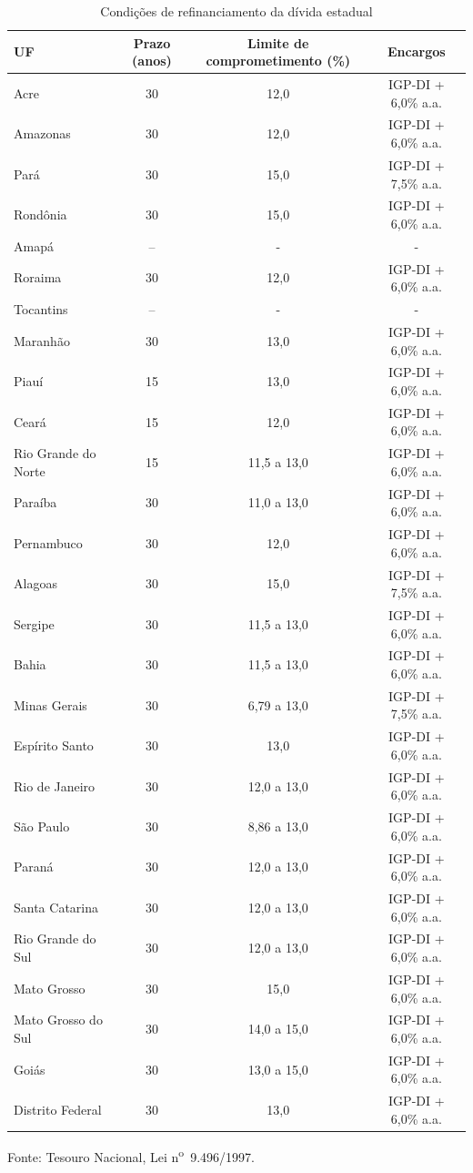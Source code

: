 \begin{table}[!htbp]
\centering
\caption{Condições de refinanciamento da dívida estadual}
\label{tab:tetos}
\small
\begin{tabular}{@{}lccc@{}}
\toprule
UF & Prazo (anos) & Limite de comprometimento (\%) & Encargos\\
\midrule
Acre & 30 & 12,0 & IGP-DI + 6,0\% a.a.\\
Amazonas & 30 & 12,0 & IGP-DI + 6,0\% a.a.\\
Pará & 30 & 15,0 & IGP-DI + 7,5\% a.a.\\
Rondônia & 30 & 15,0 & IGP-DI + 6,0\% a.a.\\
Amapá & -- & - & -\\
Roraima & 30 & 12,0 & IGP-DI + 6,0\% a.a.\\
Tocantins & -- & - & -\\
\midrule
Maranhão & 30 & 13,0 & IGP-DI + 6,0\% a.a.\\
Piauí & 15 & 13,0 & IGP-DI + 6,0\% a.a.\\
Ceará & 15 & 12,0 & IGP-DI + 6,0\% a.a.\\
Rio Grande do Norte & 15 & 11,5 a 13,0 & IGP-DI + 6,0\% a.a.\\
Paraíba & 30 & 11,0 a 13,0 & IGP-DI + 6,0\% a.a.\\
Pernambuco & 30 & 12,0 & IGP-DI + 6,0\% a.a.\\
Alagoas & 30 & 15,0 & IGP-DI + 7,5\% a.a.\\
Sergipe & 30 & 11,5 a 13,0 & IGP-DI + 6,0\% a.a.\\
Bahia & 30 & 11,5 a 13,0 & IGP-DI + 6,0\% a.a.\\
\midrule
Minas Gerais & 30 & 6,79 a 13,0 & IGP-DI + 7,5\% a.a.\\
Espírito Santo & 30 & 13,0 & IGP-DI + 6,0\% a.a.\\
Rio de Janeiro & 30 & 12,0 a 13,0 & IGP-DI + 6,0\% a.a.\\
São Paulo & 30 & 8,86 a 13,0 & IGP-DI + 6,0\% a.a.\\
\midrule
Paraná & 30 & 12,0 a 13,0 & IGP-DI + 6,0\% a.a.\\
Santa Catarina & 30 & 12,0 a 13,0 & IGP-DI + 6,0\% a.a.\\
Rio Grande do Sul & 30 & 12,0 a 13,0 & IGP-DI + 6,0\% a.a.\\
\midrule
Mato Grosso & 30 & 15,0 & IGP-DI + 6,0\% a.a.\\
Mato Grosso do Sul & 30 & 14,0 a 15,0 & IGP-DI + 6,0\% a.a.\\
Goiás & 30 & 13,0 a 15,0 & IGP-DI + 6,0\% a.a.\\
Distrito Federal & 30 & 13,0 & IGP-DI + 6,0\% a.a.\\
\bottomrule
\end{tabular}
\par
\vspace{6pt}
\centering
\footnotesize Fonte: Tesouro Nacional, Lei n\textsuperscript{o}~9.496/1997.
\end{table}